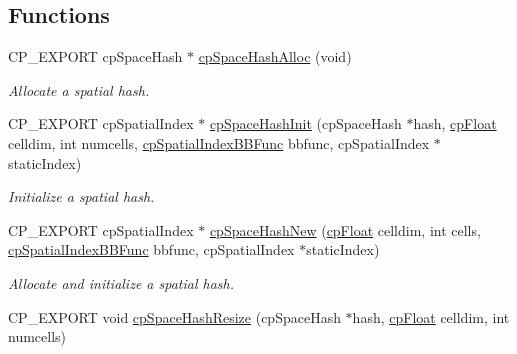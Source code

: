 \subsection*{Functions}
\begin{DoxyCompactItemize}
\item 
\mbox{\label{group__cp_spatial_index_ga2ac528e9008a2ab964d77fb33ab3daa2}} 
C\+P\+\_\+\+E\+X\+P\+O\+RT cp\+Space\+Hash $\ast$ \mbox{\hyperlink{group__cp_spatial_index_ga2ac528e9008a2ab964d77fb33ab3daa2}{cp\+Space\+Hash\+Alloc}} (void)
\begin{DoxyCompactList}\small\item\em Allocate a spatial hash. \end{DoxyCompactList}\item 
\mbox{\label{group__cp_spatial_index_gaf9acc339ae248b5e1ecfd91633f23aba}} 
C\+P\+\_\+\+E\+X\+P\+O\+RT cp\+Spatial\+Index $\ast$ \mbox{\hyperlink{group__cp_spatial_index_gaf9acc339ae248b5e1ecfd91633f23aba}{cp\+Space\+Hash\+Init}} (cp\+Space\+Hash $\ast$hash, \mbox{\hyperlink{group__basic_types_gac1ed65573e035bf892505768c852d8d3}{cp\+Float}} celldim, int numcells, \mbox{\hyperlink{group__cp_spatial_index_gaa8cf991cadcee1fbb6ee9379a0a6e0ea}{cp\+Spatial\+Index\+B\+B\+Func}} bbfunc, cp\+Spatial\+Index $\ast$static\+Index)
\begin{DoxyCompactList}\small\item\em Initialize a spatial hash. \end{DoxyCompactList}\item 
\mbox{\label{group__cp_spatial_index_ga3d96bf4bb199157b9a107345dd3d3ae7}} 
C\+P\+\_\+\+E\+X\+P\+O\+RT cp\+Spatial\+Index $\ast$ \mbox{\hyperlink{group__cp_spatial_index_ga3d96bf4bb199157b9a107345dd3d3ae7}{cp\+Space\+Hash\+New}} (\mbox{\hyperlink{group__basic_types_gac1ed65573e035bf892505768c852d8d3}{cp\+Float}} celldim, int cells, \mbox{\hyperlink{group__cp_spatial_index_gaa8cf991cadcee1fbb6ee9379a0a6e0ea}{cp\+Spatial\+Index\+B\+B\+Func}} bbfunc, cp\+Spatial\+Index $\ast$static\+Index)
\begin{DoxyCompactList}\small\item\em Allocate and initialize a spatial hash. \end{DoxyCompactList}\item 
C\+P\+\_\+\+E\+X\+P\+O\+RT void \mbox{\hyperlink{group__cp_spatial_index_gac6ac718f3e9509abc2c01d256d4217a5}{cp\+Space\+Hash\+Resize}} (cp\+Space\+Hash $\ast$hash, \mbox{\hyperlink{group__basic_types_gac1ed65573e035bf892505768c852d8d3}{cp\+Float}} celldim, int numcells)

\end{DoxyCompactItemize}
